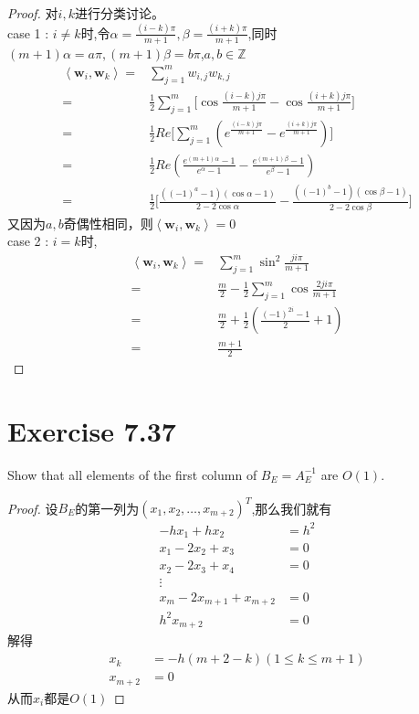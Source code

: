 \documentclass[twoside,a4paper]{ctexart}
\newcommand{\avg}[1]{\left\langle #1 \right\rangle}
\begin{document}
\begin{proof}
  对$i,k$进行分类讨论。\\
  case 1 : $i\neq k$时,令$\alpha = \frac{(i-k)\pi}{m+1}, \beta = \frac{(i+k)\pi}{m+1}$,同时$(m+1)\alpha = a\pi, (m+1)\beta = b\pi$,$a,b \in \mathbb{Z}$
  \begin{align*}
    \avg{\textbf{w}_i,\textbf{w}_k} ={} & \sum_{j=1}^{m} w_{i,j}w_{k,j} \\
    ={} & \frac{1}{2}\sum_{j=1}^{m}\lbrack \cos\frac{(i-k)j\pi}{m+1} - \cos\frac{(i+k)j\pi}{m+1}\rbrack \\
    ={} & \frac{1}{2}Re\lbrack\sum_{j=1}^{m}(e^{\frac{(i-k)j\pi}{m+1}}-e^{\frac{(i+k)j\pi}{m+1}})\rbrack \\
    ={} & \frac{1}{2}Re(\frac{e^{(m+1)\alpha}-1}{e^{\alpha}-1}-\frac{e^{(m+1)\beta}-1}{e^{\beta}-1}) \\
    ={} & \frac{1}{2}\lbrack\frac{((-1)^a-1)(\cos\alpha -1)}{2-2\cos\alpha}-\frac{((-1)^b-1)(\cos\beta -1)}{2-2\cos\beta}\rbrack
  \end{align*}
  又因为$a,b$奇偶性相同，则$\avg{\textbf{w}_i,\textbf{w}_k} = 0$ \\
  case 2 : $i = k$时,
  \begin{align*}
    \avg{\textbf{w}_i,\textbf{w}_k} ={} & \sum_{j=1}^{m}\sin^2\frac{ji\pi}{m+1} \\
    ={} & \frac{m}{2} - \frac{1}{2}\sum_{j=1}^{m}\cos\frac{2ji\pi}{m+1} \\
    ={} & \frac{m}{2} + \frac{1}{2}(\frac{(-1)^{2i}-1}{2} + 1) \\
    ={} & \frac{m+1}{2}
  \end{align*}
\end{proof}

\section*{Exercise 7.37}
Show that all elements of the first column of $B_E = A_E^{-1}$ are $O(1)$.
\begin{proof}
  设$B_E$的第一列为$(x_1,x_2,\dots,x_{m+2})^T$,那么我们就有
  \begin{equation*}
    \begin{aligned}
      -hx_1+hx_2 &= h^2 \\
      x_1-2x_2+x_3 &= 0 \\
      x_2-2x_3+x_4 &= 0 \\
      \vdots \\
      x_m-2x_{m+1}+x_{m+2} &= 0 \\
      h^2x_{m+2} &= 0 
    \end{aligned}
  \end{equation*}
     解得
  \begin{equation*}
    \begin{aligned}
      x_k &= -h(m+2-k) (1\leq k\leq m+1)\\
      x_{m+2} &= 0 
    \end{aligned}
  \end{equation*}
     从而${x_i}$都是$O(1)$
   \end{proof}
\end{document}
